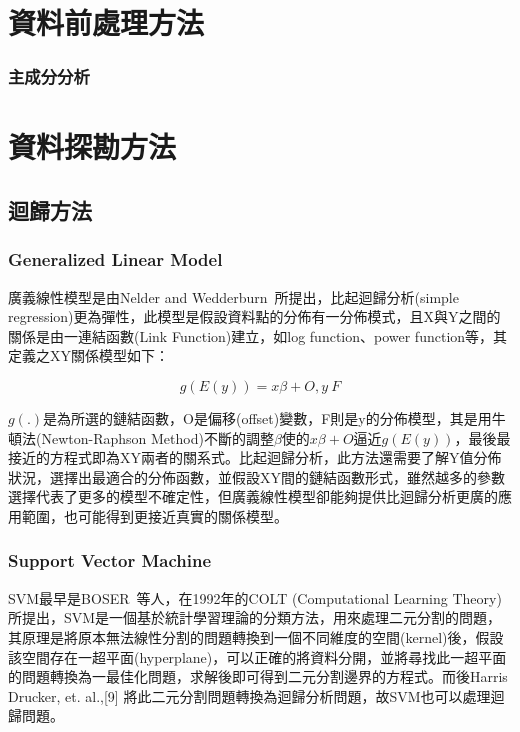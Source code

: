 \section{資料前處理方法}

\subsubsection{主成分分析}



\section{資料探勘方法}

\subsection{迴歸方法}

\subsubsection{Generalized Linear Model}

廣義線性模型是由Nelder and Wedderburn~\cite{citeulike:5485398}所提出，比起迴歸分析(simple regression)更為彈性，此模型是假設資料點的分佈有一分佈模式，且X與Y之間的關係是由一連結函數(Link Function)建立，如log function、power function等，其定義之XY關係模型如下：


\begin{equation} g(E(y)) = x\beta + O, y~F \label{eq:GLM}\end{equation} 

$g(.)$是為所選的鏈結函數，O是偏移(offset)變數，F則是y的分佈模型，其是用牛頓法(Newton-Raphson Method)不斷的調整$\beta$使的$x\beta + O$逼近$g(E(y))$，最後最接近的方程式即為XY兩者的關系式。比起迴歸分析，此方法還需要了解Y值分佈狀況，選擇出最適合的分佈函數，並假設XY間的鏈結函數形式，雖然越多的參數選擇代表了更多的模型不確定性，但廣義線性模型卻能夠提供比迴歸分析更廣的應用範圍，也可能得到更接近真實的關係模型。

\subsubsection{Support Vector Machine}

SVM最早是BOSER~\cite{boser1992}等人，在1992年的COLT (Computational Learning Theory)所提出，SVM是一個基於統計學習理論的分類方法，用來處理二元分割的問題，其原理是將原本無法線性分割的問題轉換到一個不同維度的空間(kernel)後，假設該空間存在一超平面(hyperplane)，可以正確的將資料分開，並將尋找此一超平面的問題轉換為一最佳化問題，求解後即可得到二元分割邊界的方程式。而後Harris Drucker, et. al.,[9] 將此二元分割問題轉換為迴歸分析問題，故SVM也可以處理迴歸問題。

